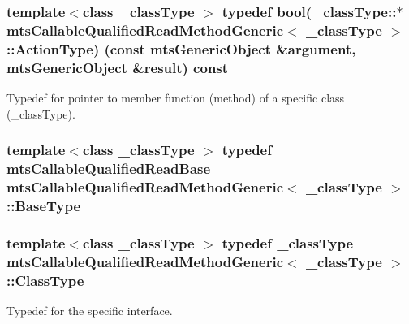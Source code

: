 \subsubsection[{Action\+Type}]{\setlength{\rightskip}{0pt plus 5cm}template$<$class \+\_\+class\+Type $>$ typedef bool(\+\_\+class\+Type\+::$\ast$ {\bf mts\+Callable\+Qualified\+Read\+Method\+Generic}$<$ \+\_\+class\+Type $>$\+::Action\+Type) (const {\bf mts\+Generic\+Object} \&argument, {\bf mts\+Generic\+Object} \&result) const }\label{classmts_callable_qualified_read_method_generic_afe3373d95d9a97f9737078e041f945d8}
Typedef for pointer to member function (method) of a specific class (\+\_\+class\+Type). \hypertarget{classmts_callable_qualified_read_method_generic_a773d5a3d8a4847835a36aa9ccfb93774}{}
\subsubsection[{Base\+Type}]{\setlength{\rightskip}{0pt plus 5cm}template$<$class \+\_\+class\+Type $>$ typedef {\bf mts\+Callable\+Qualified\+Read\+Base} {\bf mts\+Callable\+Qualified\+Read\+Method\+Generic}$<$ \+\_\+class\+Type $>$\+::{\bf Base\+Type}}\label{classmts_callable_qualified_read_method_generic_a773d5a3d8a4847835a36aa9ccfb93774}
\hypertarget{classmts_callable_qualified_read_method_generic_ada2d394b00a2db849dd5d67b965fd63b}{}
\subsubsection[{Class\+Type}]{\setlength{\rightskip}{0pt plus 5cm}template$<$class \+\_\+class\+Type $>$ typedef \+\_\+class\+Type {\bf mts\+Callable\+Qualified\+Read\+Method\+Generic}$<$ \+\_\+class\+Type $>$\+::{\bf Class\+Type}}\label{classmts_callable_qualified_read_method_generic_ada2d394b00a2db849dd5d67b965fd63b}
Typedef for the specific interface. \hypertarget{classmts_callable_qualified_read_method_generic_ae4d162ce942aeab0d486d2aa8f001a39}{}
